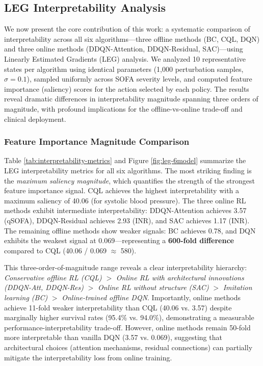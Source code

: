 \subsection{LEG Interpretability Analysis}\label{sec:results:leg}

We now present the core contribution of this work: a systematic comparison of interpretability across all six algorithms---three offline methods (BC, CQL, DQN) and three online methods (DDQN-Attention, DDQN-Residual, SAC)---using Linearly Estimated Gradients (LEG) analysis. We analyzed 10 representative states per algorithm using identical parameters (1,000 perturbation samples, $\sigma=0.1$), sampled uniformly across SOFA severity levels, and computed feature importance (saliency) scores for the action selected by each policy. The results reveal dramatic differences in interpretability magnitude spanning three orders of magnitude, with profound implications for the offline-vs-online trade-off and clinical deployment.

\subsubsection{Feature Importance Magnitude Comparison}

Table \ref{tab:interpretability-metrics} and Figure \ref{fig:leg-6model} summarize the LEG interpretability metrics for all six algorithms. The most striking finding is the \textit{maximum saliency magnitude}, which quantifies the strength of the strongest feature importance signal. CQL achieves the highest interpretability with a maximum saliency of 40.06 (for systolic blood pressure). The three online RL methods exhibit intermediate interpretability: DDQN-Attention achieves 3.57 (qSOFA), DDQN-Residual achieves 2.93 (INR), and SAC achieves 1.17 (INR). The remaining offline methods show weaker signals: BC achieves 0.78, and DQN exhibits the weakest signal at 0.069—representing a \textbf{600-fold difference} compared to CQL (40.06 / 0.069 $\approx$ 580).

This three-order-of-magnitude range reveals a clear interpretability hierarchy: \textit{Conservative offline RL (CQL)} $>$ \textit{Online RL with architectural innovations (DDQN-Att, DDQN-Res)} $>$ \textit{Online RL without structure (SAC)} $>$ \textit{Imitation learning (BC)} $>$ \textit{Online-trained offline DQN}. Importantly, online methods achieve 11-fold weaker interpretability than CQL (40.06 vs. 3.57) despite marginally higher survival rates (95.4\% vs. 94.0\%), demonstrating a measurable performance-interpretability trade-off. However, online methods remain 50-fold more interpretable than vanilla DQN (3.57 vs. 0.069), suggesting that architectural choices (attention mechanisms, residual connections) can partially mitigate the interpretability loss from online training.

